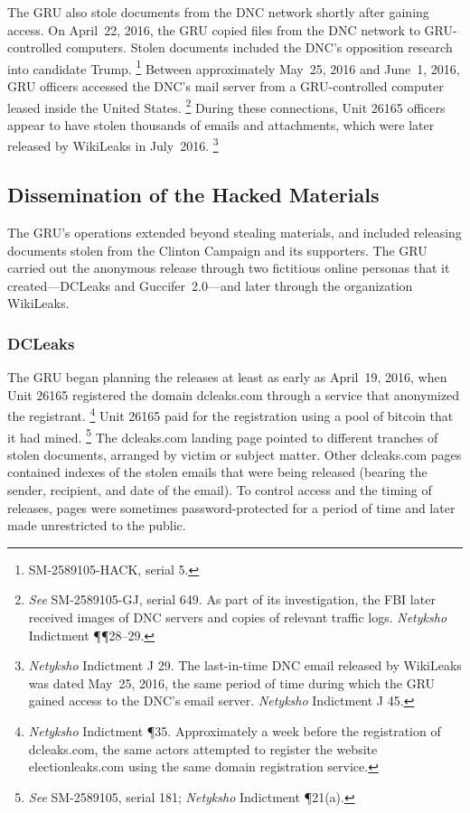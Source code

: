 The GRU also stole documents from the DNC network shortly after gaining access.
On April~22, 2016, the GRU copied files from the DNC network to GRU-controlled computers.
Stolen documents included the DNC's opposition research into candidate Trump.%
\footnote{ SM-2589105-HACK, serial 5.
}
Between approximately May~25, 2016 and June~1, 2016, GRU officers accessed the DNC's mail server from a  GRU-controlled computer leased inside the United States.%
\footnote{
\textit{See} SM-2589105-GJ, serial 649. As part of its investigation, the FBI later received images of DNC servers and copies of relevant traffic logs.
\textit{Netyksho} Indictment \P\P 28--29.}
During these connections, Unit 26165 officers appear to have stolen thousands of emails and attachments, which were later released by WikiLeaks in July~2016.%
\footnote{\textit{Netyksho} Indictment J 29.
The last-in-time DNC email released by WikiLeaks was dated May~25, 2016, the same period of time during which the GRU gained access to the DNC's email server.
\textit{Netyksho} Indictment J 45.}

\subsection{Dissemination of the Hacked Materials}

The GRU's operations extended beyond stealing materials, and included releasing documents stolen from the Clinton Campaign and its supporters.
The GRU carried out the anonymous release through two fictitious online personas that it created---DCLeaks and Guccifer~2.0---and later through the organization WikiLeaks.

\subsubsection{DCLeaks}

The GRU began planning the releases at least as early as April~19, 2016, when Unit 26165 registered the domain dcleaks.com through a service that anonymized the registrant.%
\footnote{\textit{Netyksho} Indictment \P 35.
Approximately a week before the registration of dcleaks.com, the same actors attempted to register the website electionleaks.com using the same domain registration service.
}
Unit 26165 paid for the registration using a pool of bitcoin that it had mined.%
\footnote{\textit{See} SM-2589105, serial 181;
\textit{Netyksho} Indictment \P 21(a).}
The dcleaks.com landing page pointed to different tranches of stolen documents, arranged by victim or subject matter.
Other dcleaks.com pages contained indexes of the stolen emails that were being released (bearing the sender, recipient, and date of the email).
To control access and the timing of releases, pages were sometimes password-protected for a period of time and later made unrestricted to the public.

